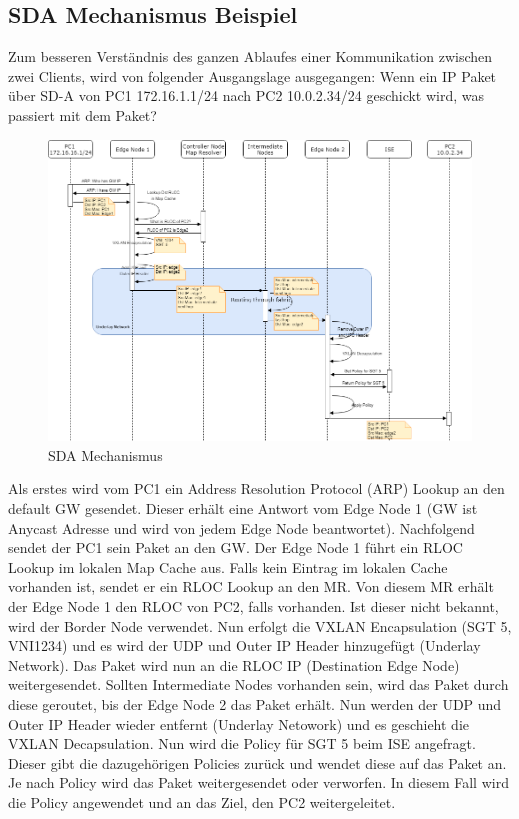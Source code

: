 \subsection{SDA Mechanismus Beispiel}
Zum besseren Verständnis des ganzen Ablaufes einer Kommunikation zwischen zwei Clients, wird von folgender Ausgangslage ausgegangen: Wenn ein IP Paket über SD-A von PC1 172.16.1.1/24 nach PC2 10.0.2.34/24 geschickt wird, was passiert mit dem Paket?

\begin{figure}[H]
	\centering
	\includegraphics[width=16cm]{img/SDA_Mechanismus-NewVersion.png}
	\caption{SDA Mechanismus}
	\label{fig:SDA Mechanismus}
\end{figure}

Als erstes wird vom PC1 ein Address Resolution Protocol (ARP) Lookup an den default GW gesendet. Dieser erhält eine Antwort vom Edge Node 1 (GW ist Anycast Adresse und wird von jedem Edge Node beantwortet). Nachfolgend sendet der PC1 sein Paket an den GW. Der Edge Node 1 führt ein RLOC Lookup im lokalen Map Cache aus. Falls kein Eintrag im lokalen Cache vorhanden ist, sendet er ein RLOC Lookup an den MR. Von diesem MR erhält der Edge Node 1 den RLOC von PC2, falls vorhanden. Ist dieser nicht bekannt, wird der Border Node verwendet. Nun erfolgt die VXLAN Encapsulation (SGT 5, VNI1234) und es wird der UDP und Outer IP Header hinzugefügt (Underlay Network). Das Paket wird nun an die RLOC IP (Destination Edge Node) weitergesendet. Sollten Intermediate Nodes vorhanden sein, wird das Paket durch diese geroutet, bis der Edge Node 2 das Paket erhält. Nun werden der UDP und Outer IP Header wieder entfernt (Underlay Netowork) und es geschieht die VXLAN Decapsulation. Nun wird die Policy für SGT 5 beim ISE angefragt. Dieser gibt die dazugehörigen Policies zurück und wendet diese auf das Paket an. Je nach Policy wird das Paket weitergesendet oder verworfen. In diesem Fall wird die Policy angewendet und an das Ziel, den PC2 weitergeleitet.



